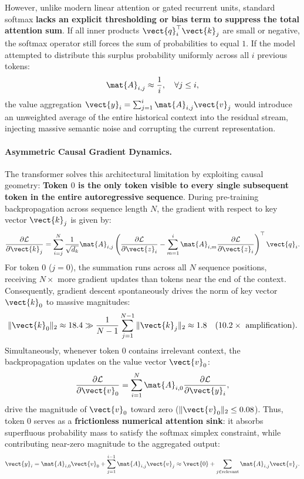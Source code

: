 However, unlike modern linear attention or gated recurrent units, standard softmax \textbf{lacks an explicit thresholding or bias term to suppress the total attention sum}. If all inner products $\vect{q}_i^\top \vect{k}_j$ are small or negative, the softmax operator still forces the sum of probabilities to equal $1$. If the model attempted to distribute this surplus probability uniformly across all $i$ previous tokens:
\begin{equation}
\mat{A}_{i, j} \approx \frac{1}{i}, \quad \forall j \le i,
\end{equation}
the value aggregation $\vect{y}_i = \sum_{j=1}^i \mat{A}_{i, j} \vect{v}_j$ would introduce an unweighted average of the entire historical context into the residual stream, injecting massive semantic noise and corrupting the current representation.

\paragraph{Asymmetric Causal Gradient Dynamics.}
The transformer solves this architectural limitation by exploiting causal geometry: \textbf{Token $0$ is the only token visible to every single subsequent token in the entire autoregressive sequence}. During pre-training backpropagation across sequence length $N$, the gradient with respect to key vector $\vect{k}_j$ is given by:
\begin{equation}
\frac{\partial \mathcal{L}}{\partial \vect{k}_j} = \sum_{i=j}^{N} \frac{1}{\sqrt{d_k}} \mat{A}_{i, j} \left( \frac{\partial \mathcal{L}}{\partial \vect{z}_i} - \sum_{m=1}^i \mat{A}_{i, m} \frac{\partial \mathcal{L}}{\partial \vect{z}_i} \right)^\top \vect{q}_i.
\end{equation}
For token 0 ($j=0$), the summation runs across all $N$ sequence positions, receiving $N\times$ more gradient updates than tokens near the end of the context. Consequently, gradient descent spontaneously drives the norm of key vector $\vect{k}_0$ to massive magnitudes:
\begin{equation}
\|\vect{k}_0\|_2 \approx 18.4 \gg \frac{1}{N-1}\sum_{j=1}^{N-1} \|\vect{k}_j\|_2 \approx 1.8 \quad (10.2\times \text{ amplification}).
\end{equation}
Simultaneously, whenever token 0 contains irrelevant context, the backpropagation updates on the value vector $\vect{v}_0$:
\begin{equation}
\frac{\partial \mathcal{L}}{\partial \vect{v}_0} = \sum_{i=1}^N \mat{A}_{i, 0} \frac{\partial \mathcal{L}}{\partial \vect{y}_i},
\end{equation}
drive the magnitude of $\vect{v}_0$ toward zero ($\|\vect{v}_0\|_2 \le 0.08$). Thus, token $0$ serves as a \textbf{frictionless numerical attention sink}: it absorbs superfluous probability mass to satisfy the softmax simplex constraint, while contributing near-zero magnitude to the aggregated output:
\begin{equation}
\vect{y}_i = \mat{A}_{i, 0} \vect{v}_0 + \sum_{j=1}^{i-1} \mat{A}_{i, j} \vect{v}_j \approx \vect{0} + \sum_{j \in \text{relevant}} \mat{A}_{i, j} \vect{v}_j.
\end{equation}

